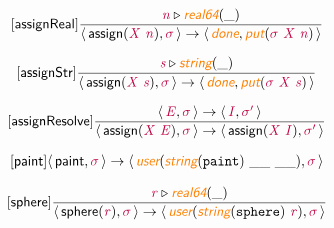 \documentclass[10pt,leqno,fleqn]{article}
\newcommand{\artVariable}[1]{\mbox{\color{purple}\em #1\/}}
\newcommand{\artConstructor}[1]{\mbox{\sf #1}}
\newcommand{\artCaseInsensitiveLiteral}[1]{\mbox{\tt #1}}
\newcommand{\artSpecial}[1]{\mbox{\color{orange}\sf\em #1}}
\begin{document}
\begin{equation}
\tag*{[\artConstructor{\sf assignReal}]}
\begin{split}\frac{ \artVariable{n}\triangleright \artSpecial{real64}(\_) }{\langle\, \artConstructor{\sf assign}(\artVariable{X}\ \artVariable{n}), \artVariable{$\sigma$}\,\rangle \rightarrow \langle\, \artSpecial{done}, \artSpecial{put}(\artVariable{$\sigma$}\ \artVariable{X}\ \artVariable{n})\,\rangle }
\end{split}
\end{equation}

\begin{equation}
\tag*{[\artConstructor{\sf assignStr}]}
\begin{split}\frac{ \artVariable{s}\triangleright \artSpecial{string}(\_) }{\langle\, \artConstructor{\sf assign}(\artVariable{X}\ \artVariable{s}), \artVariable{$\sigma$}\,\rangle \rightarrow \langle\, \artSpecial{done}, \artSpecial{put}(\artVariable{$\sigma$}\ \artVariable{X}\ \artVariable{s})\,\rangle }
\end{split}
\end{equation}

\begin{equation}
\tag*{[\artConstructor{\sf assignResolve}]}
\begin{split}\frac{\langle\, \artVariable{E}, \artVariable{$\sigma$}\,\rangle \rightarrow \langle\, \artVariable{I}, \artVariable{$\sigma$\/$^\prime$}\,\rangle }{\langle\, \artConstructor{\sf assign}(\artVariable{X}\ \artVariable{E}), \artVariable{$\sigma$}\,\rangle \rightarrow \langle\, \artConstructor{\sf assign}(\artVariable{X}\ \artVariable{I}), \artVariable{$\sigma$\/$^\prime$}\,\rangle }
\end{split}
\end{equation}

\begin{equation}
\tag*{[\artConstructor{\sf paint}]}
\begin{split}\langle\, \artConstructor{\sf paint}, \artVariable{$\sigma$}\,\rangle \rightarrow \langle\, \artSpecial{user}(\artSpecial{string}(\artCaseInsensitiveLiteral{paint})\ \_\_\ \_\_), \artVariable{$\sigma$}\,\rangle 
\end{split}
\end{equation}

\begin{equation}
\tag*{[\artConstructor{\sf sphere}]}
\begin{split}\frac{ \artVariable{r}\triangleright \artSpecial{real64}(\_) }{\langle\, \artConstructor{\sf sphere}(\artVariable{r}), \artVariable{$\sigma$}\,\rangle \rightarrow \langle\, \artSpecial{user}(\artSpecial{string}(\artCaseInsensitiveLiteral{sphere})\ \artVariable{r}), \artVariable{$\sigma$}\,\rangle }
\end{split}
\end{equation}
\end{document}
